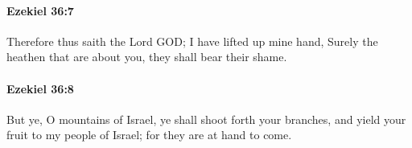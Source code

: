 		\paragraph{Ezekiel 36:7} %
			\label{EZEKIEL-36-7}

			Therefore thus saith the Lord GOD; I have lifted up mine hand, Surely the heathen that are about you, they shall bear their shame.


		\paragraph{Ezekiel 36:8} %
			\label{EZEKIEL-36-8}

			But ye, O mountains of Israel, ye shall shoot forth your branches, and yield your fruit to my people of Israel; for they are at hand to come.


